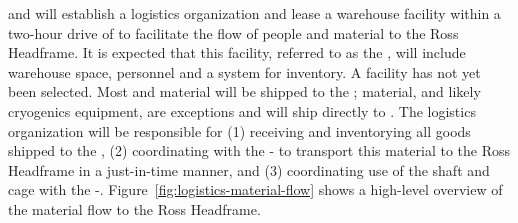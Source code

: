  and  will establish a logistics organization and lease a warehouse facility within a two-hour drive of   to facilitate the flow of people and material to the Ross Headframe.  It is expected that this facility, referred to as the , will include warehouse space, personnel and a  system for inventory.  A facility has not yet been selected. 
Most  and  material will be shipped to the ;  material, and likely cryogenics equipment, are exceptions and will ship directly to . The logistics  organization will be responsible for (1) receiving and inventorying all  goods shipped to the , (2) coordinating with the -  to transport this material to the Ross Headframe in a just-in-time manner, and (3) coordinating use of the shaft and cage with the -. Figure~\ref{fig:logistics-material-flow} shows a high-level overview of the material flow to the Ross Headframe.


 
 
